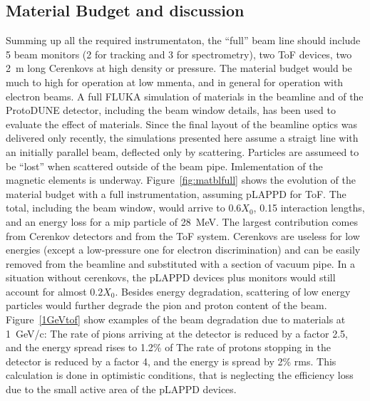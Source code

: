 \subsection{Material Budget and discussion}
Summing up all the required instrumentaton, the ``full'' beam line should include 5 beam monitors (2 for tracking and 3 for spectrometry), two ToF devices, two 2~m long Cerenkovs at high density or pressure. The material budget would be much to high for operation at low mmenta, and in general for operation with electron beams.  
A full FLUKA simulation of materials in the beamline and of the ProtoDUNE detector, including the beam window details, has been used to evaluate the effect of materials. Since the final layout of the beamline optics was delivered only recently, the simulations presented here assume a straigt line with an initially parallel beam, deflected only by scattering. Particles are assumeed to be ``lost'' when scattered outside of the beam pipe. Imlementation of the magnetic elements is underway.
 Figure~\ref{fig:matblfull} shows the evolution of the material budget with a full instrumentation, assuming pLAPPD for ToF. The total, including the beam window, would arrive to $0.6X_0$, 0.15 interaction lengths, and an energy loss for a mip particle of 28~MeV.
The largest contribution comes from Cerenkov detectors and from the  ToF system. Cerenkovs are useless for low energies (except a low-pressure one for electron discrimination) and can be easily removed from the beamline and substituted with a section of vacuum pipe.  
In a situation without cerenkovs, the pLAPPD devices plus monitors would still account for almost  $0.2X_0$. Besides energy degradation, scattering of low energy particles would  further degrade the pion and proton content of the beam.  Figure~\ref{1GeVtof} show examples of the beam degradation due to materials at 1~GeV/c: The rate of pions arriving at the detector is reduced by a factor 2.5, and the energy spread rises to 1.2\% of The rate of protons stopping in the detector is reduced by a factor 4, and the energy is spread by 2\% rms. This calculation is done in optimistic conditions, that is neglecting the efficiency loss due to the small active area of the pLAPPD devices.

